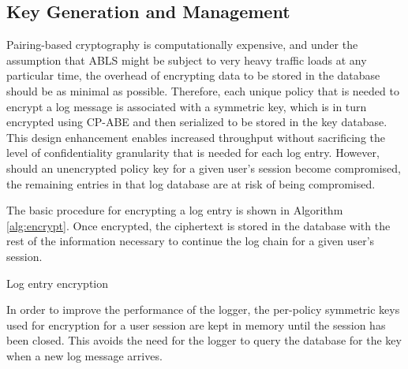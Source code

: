 \documentclass{sig-alternate}
\begin{document}
\subsection{Key Generation and Management}
Pairing-based cryptography is computationally expensive, and under the assumption that ABLS might be subject 
to very heavy traffic loads at any particular time, the 
overhead of encrypting data to be stored in the database should be as minimal as possible. Therefore, each unique
policy that is needed to encrypt a log message is associated with a symmetric key, which is in 
turn encrypted using CP-ABE and then serialized to be stored in the key database. 
This design enhancement enables increased throughput without sacrificing the 
level of confidentiality granularity that is needed for each log entry. However, should an 
unencrypted policy key for a given user's session become compromised, the remaining entries in that log database are at risk of being compromised. 

The basic procedure for encrypting a log entry is shown in Algorithm \ref{alg:encrypt}. Once encrypted, the ciphertext
is stored in the database with the rest of the information necessary to continue the log chain for a given user's session.
  
\begin{algorithm}[h] %
\caption{Log entry encryption} \label{alg:encrypt}
\begin{algorithmic}[1]

\ELSE
\ENDIF
{}
\end{algorithmic}
\end{algorithm}

In order to improve the performance of the logger, the per-policy symmetric keys used for encryption for a user session are kept
in memory until the session has been closed. This avoids the need for the logger to query the database for the key 
when a new log message arrives. 
\end{document}
